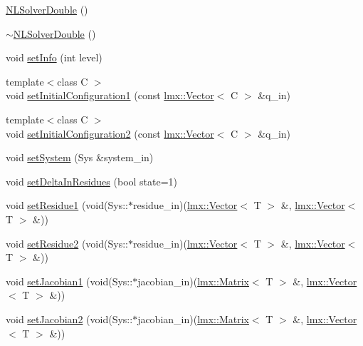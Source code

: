 \begin{DoxyCompactItemize}
\item 
\hyperlink{classlmx_1_1NLSolverDouble_a93900c9c889168ba9bb751ef1e32048c}{N\-L\-Solver\-Double} ()
\item 
\hyperlink{classlmx_1_1NLSolverDouble_aa948e78a7f2eef069fe97d84828b9b56}{$\sim$\-N\-L\-Solver\-Double} ()
\item 
void \hyperlink{classlmx_1_1NLSolverDouble_abfed7100d63a01d4ba7464e420ee4f74}{set\-Info} (int level)
\item 
{\footnotesize template$<$class C $>$ }\\void \hyperlink{classlmx_1_1NLSolverDouble_a25935eff4430168ea01f93bddb7697d2}{set\-Initial\-Configuration1} (const \hyperlink{classlmx_1_1Vector}{lmx\-::\-Vector}$<$ C $>$ \&q\-\_\-in)
\item 
{\footnotesize template$<$class C $>$ }\\void \hyperlink{classlmx_1_1NLSolverDouble_a42439b421ea96d4daffad351ef72c76d}{set\-Initial\-Configuration2} (const \hyperlink{classlmx_1_1Vector}{lmx\-::\-Vector}$<$ C $>$ \&q\-\_\-in)
\item 
void \hyperlink{classlmx_1_1NLSolverDouble_a3e0016f1eb456c9a655ce677755d8d24}{set\-System} (Sys \&system\-\_\-in)
\item 
void \hyperlink{classlmx_1_1NLSolverDouble_a27d0f4f2d2a270668f403e5a45f387e5}{set\-Delta\-In\-Residues} (bool state=1)
\item 
void \hyperlink{classlmx_1_1NLSolverDouble_a948a70dfcb7b3219222fcca5193b7d05}{set\-Residue1} (void(Sys\-::$\ast$residue\-\_\-in)(\hyperlink{classlmx_1_1Vector}{lmx\-::\-Vector}$<$ T $>$ \&, \hyperlink{classlmx_1_1Vector}{lmx\-::\-Vector}$<$ T $>$ \&))
\item 
void \hyperlink{classlmx_1_1NLSolverDouble_a2c762391538b1bcf908c37d1ed4914f9}{set\-Residue2} (void(Sys\-::$\ast$residue\-\_\-in)(\hyperlink{classlmx_1_1Vector}{lmx\-::\-Vector}$<$ T $>$ \&, \hyperlink{classlmx_1_1Vector}{lmx\-::\-Vector}$<$ T $>$ \&))
\item 
void \hyperlink{classlmx_1_1NLSolverDouble_a604ffeb49157aa5aa2e21db823197991}{set\-Jacobian1} (void(Sys\-::$\ast$jacobian\-\_\-in)(\hyperlink{classlmx_1_1Matrix}{lmx\-::\-Matrix}$<$ T $>$ \&, \hyperlink{classlmx_1_1Vector}{lmx\-::\-Vector}$<$ T $>$ \&))
\item 
void \hyperlink{classlmx_1_1NLSolverDouble_a914be1ece9ec5a274593a8befdb9212b}{set\-Jacobian2} (void(Sys\-::$\ast$jacobian\-\_\-in)(\hyperlink{classlmx_1_1Matrix}{lmx\-::\-Matrix}$<$ T $>$ \&, \hyperlink{classlmx_1_1Vector}{lmx\-::\-Vector}$<$ T $>$ \&))

\end{DoxyCompactItemize}
